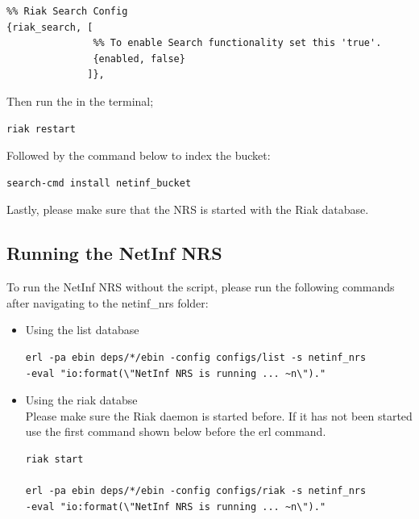 \begin{verbatim}
%% Riak Search Config
{riak_search, [
               %% To enable Search functionality set this 'true'.
               {enabled, false}
              ]},
\end{verbatim}

Then run the in the terminal;

\begin{verbatim}
riak restart
\end{verbatim}

Followed by the command below to index the bucket:

\begin{verbatim}
search-cmd install netinf_bucket
\end{verbatim}

Lastly, please make sure that the NRS is started with the Riak database.

\subsection{Running the NetInf NRS}

To run the NetInf NRS without the script, please run the following commands after navigating to the netinf\_nrs folder:

\begin{itemize}
\item Using the list database \\
\begin{verbatim}
erl -pa ebin deps/*/ebin -config configs/list -s netinf_nrs 
-eval "io:format(\"NetInf NRS is running ... ~n\")." 
\end{verbatim}

\item Using the riak databse \\
Please make sure the Riak daemon is started before. If it has not been started use the first command shown below before the erl command.
\begin{verbatim}
riak start

erl -pa ebin deps/*/ebin -config configs/riak -s netinf_nrs 
-eval "io:format(\"NetInf NRS is running ... ~n\")." 
\end{verbatim}
\end{itemize}